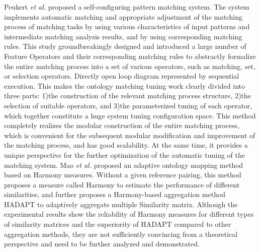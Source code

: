 \documentclass[twoside]{article}
\begin{document}
Peukert {\it et al.} proposed a self-configuring pattern matching system.
The system implements automatic matching and appropriate adjustment of the matching process of matching tasks by using various characteristics of input patterns and intermediate matching analysis results, and by using corresponding matching rules.
This study groundbreakingly designed and introduced a large number of Feature Operators and their corresponding matching rules to abstractly formalize the entire matching process into a set of various operators, such as matching, set, or selection operators.
Directly open loop diagram represented by sequential execution. This makes the ontology matching tuning work clearly divided into three parts: 1)the construction of the relevant matching process structure, 2)the selection of suitable operators, and 3)the parameterized tuning of each operator, which together constitute a huge system tuning configuration space.
This method completely realizes the modular construction of the entire matching process, which is convenient for the subsequent modular modification and improvement of the matching process, and has good scalability. At the same time, it provides a unique perspective for the further optimization of the automatic tuning of the matching system.
Mao {\it et al.} proposed an adaptive ontology mapping method based on Harmony measures\cite{wwy43}. Without a given reference pairing, this method proposes a measure called Harmony to estimate the performance of different similarities, and further proposes a Harmony-based aggregation method HADAPT to adaptively aggregate multiple Similarity matrix. Although the experimental results show the reliability of Harmony measures for different types of similarity matrices and the superiority of HADAPT compared to other aggregation methods, they are not sufficiently convincing from a theoretical perspective and need to be further analyzed and demonstrated.
\end{document}
